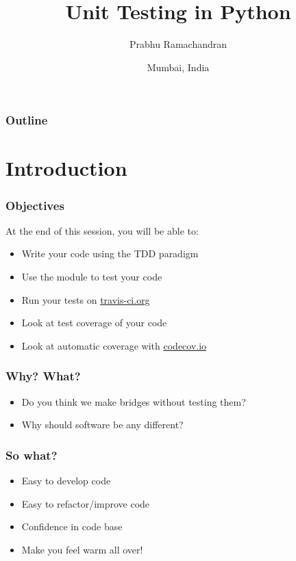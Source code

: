 \documentclass[14pt,compress]{beamer}
\title[Testing]{Unit Testing in Python}
\author[FOSSEE] {Prabhu Ramachandran}
\institute[FOSSEE -- IITB] {Department of Aerospace Engineering\\IIT Bombay}
\date[] {Mumbai, India}
\begin{document}
\begin{frame}
  \titlepage
\end{frame}

\begin{frame}
  \frametitle{Outline}
  \tableofcontents
\end{frame}

\section{Introduction}

\begin{frame}
  \frametitle{Objectives}
  At the end of this session, you will be able to:
  \begin{itemize}
  \item Write your code using the TDD paradigm
  \item Use the  module to test your code
  \item Run your tests on \url{travis-ci.org}
  \item Look at test coverage of your code
  \item Look at automatic coverage with \url{codecov.io}
  \end{itemize}
\end{frame}

\begin{frame}
  \frametitle{Why?  What?}
  \begin{itemize}
  \item Do you think we make bridges without testing them?
    \pause
    \vspace*{1in}
  \item Why should software be any different?
  \end{itemize}
\end{frame}

\begin{frame}
  \frametitle{So what?}
  \begin{itemize}
  \item Easy to develop code
  \item Easy to refactor/improve code
  \item Confidence in code base
  \item Make you feel warm all over!
  \end{itemize}
\end{frame}
\end{document}

